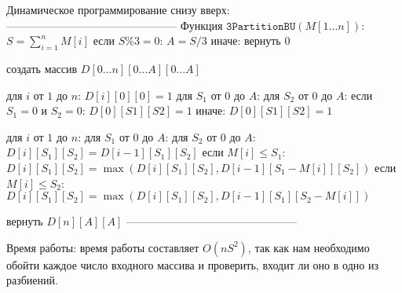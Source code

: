 Динамическое программирование снизу вверх:
-----------------------------------------------
Функция $\texttt{3PartitionBU}(M[1 \ldots n])$:
$S = \sum_{i=1}^n M[i]$
если $S \% 3 = 0$:
    $A = S / 3$
иначе:
    вернуть $0$
    
создать массив $D[0 \ldots n][0 \ldots A][0 \ldots A]$

для $i$ от $1$ до $n$:
  $D[i][0][0] = 1$
для $S_1$ от $0$ до $A$:
  для $S_2$ от $0$ до $A$:
    если $S_1 = 0$ и $S_2 = 0$:
        $D[0][S1][S2] = 1$
    иначе:
        $D[0][S1][S2] = 1$

для $i$ от $1$ до $n$:
  для $S_1$ от $0$ до $A$:
    для $S_2$ от $0$ до $A$:
      $D[i][S_1][S_2]=D[i-1][S_1][S_2]$
      если $M[i] \leq S_1$:
        $D[i][S_1][S_2] = \max(D[i][S_1][S_2], D[i - 1][S_1 - M[i]][S_2])$
      если $M[i] \leq S_2$:
        $D[i][S_1][S_2] = \max(D[i][S_1][S_2], D[i - 1][S_1][S_2 - M[i]])$

вернуть $D[n][A][A]$
-----------------------------------------------

Время работы: время работы составляет $O(nS^2)$, так как нам необходимо обойти каждое число входного массива и проверить, входит ли оно в одно из разбиений.